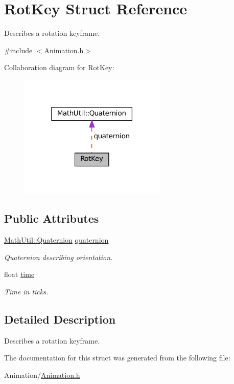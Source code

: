 \hypertarget{structRotKey}{}\section{Rot\+Key Struct Reference}
\label{structRotKey}


Describes a rotation keyframe.  




{\ttfamily \#include $<$Animation.\+h$>$}



Collaboration diagram for Rot\+Key\+:
\nopagebreak
\begin{figure}[H]
\begin{center}
\leavevmode
\includegraphics[width=198pt]{structRotKey__coll__graph}
\end{center}
\end{figure}
\subsection*{Public Attributes}
\begin{DoxyCompactItemize}
\item 
\mbox{\label{structRotKey_af4a9f13e359a47920f478f8a20c5ba49}} 
\hyperlink{structMathUtil_1_1Quaternion}{Math\+Util\+::\+Quaternion} \hyperlink{structRotKey_af4a9f13e359a47920f478f8a20c5ba49}{quaternion}
\begin{DoxyCompactList}\small\item\em Quaternion describing orientation. \end{DoxyCompactList}\item 
\mbox{\label{structRotKey_a76a0f9f78231a3329da0d6b008c21dc0}} 
float \hyperlink{structRotKey_a76a0f9f78231a3329da0d6b008c21dc0}{time}
\begin{DoxyCompactList}\small\item\em Time in ticks. \end{DoxyCompactList}\end{DoxyCompactItemize}


\subsection{Detailed Description}
Describes a rotation keyframe. 

The documentation for this struct was generated from the following file\+:\begin{DoxyCompactItemize}
\item 
Animation/\hyperlink{Animation_8h}{Animation.\+h}\end{DoxyCompactItemize}
